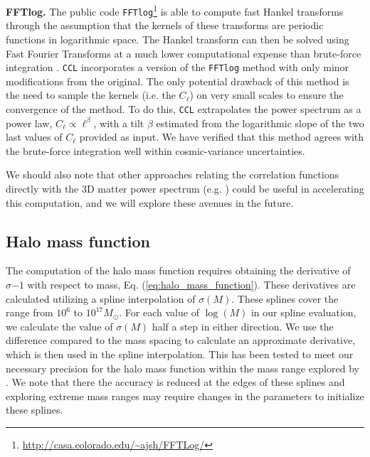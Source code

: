 \documentclass[\docopts]{\docclass}
\newcommand{\ccl}{{\tt CCL}\xspace}
\begin{document}
{\bf FFTlog.} The public code {\tt FFTlog}\footnote{\url{http://casa.colorado.edu/~ajsh/FFTLog/}} is able to compute fast Hankel transforms through the assumption that the kernels of these transforms are periodic functions in logarithmic space. The Hankel transform can then be solved using Fast Fourier Transforms at a much lower computational expense than brute-force integration \citep{Hamilton2000,Talman2009}. \ccl incorporates a version of the {\tt FFTlog} method with only minor modifications from the original. The only potential drawback of this method is the need to sample the kernels (i.e. the $C_\ell$) on very small scales to ensure the convergence of the method. To do this, \ccl extrapolates the power spectrum as a power law, $C_\ell\propto\ell^\beta$, with a tilt $\beta$ estimated from the logarithmic slope of the two last values of $C_\ell$ provided as input. We have verified that this method agrees with the brute-force integration  well within cosmic-variance uncertainties.

We should also note that other approaches relating the correlation functions directly with the 3D matter power spectrum (e.g. \citealt{2017ApJ...845...28C}) could be useful in accelerating this computation, and we will explore these avenues in the future.




\subsection{Halo mass function}

The computation of the halo mass function requires obtaining the derivative of $\sigma{-1}$ with respect to mass, Eq. (\ref{eq:halo_mass_function}). These derivatives are calculated utilizing a spline interpolation of $\sigma(M)$. These splines cover the range from $10^6$ to $10^{17} M_\odot$. For each value of $\log(M)$ in our spline evaluation, we calculate the value of $\sigma(M)$ half a step in either direction. We use the difference compared to the mass spacing to calculate an approximate derivative, which is then used in the spline interpolation. This has been tested to meet our necessary precision for the halo mass function within the mass range explored by \citet{Tinker2010}. We note that there the accuracy is reduced at the edges of these splines and exploring extreme mass ranges may require changes in the parameters to initialize these splines.
\end{document}

